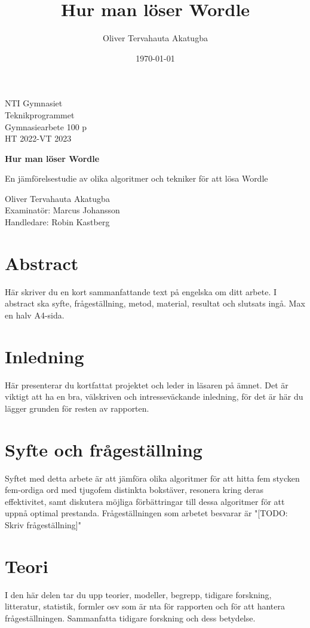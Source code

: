 \documentclass{article}
\title{Hur man löser Wordle}
\author{Oliver Tervahauta Akatugba}
\date{\today}
\begin{document}
\begin{titlepage}
\noindent
NTI Gymnasiet \\
Teknikprogrammet \\
Gymnasiearbete 100 p \\
HT 2022-VT 2023
\begin{center}
\vspace*{1.5cm}
\Huge
\textbf{Hur man löser Wordle}
\vspace{0.5cm}

\large
En jämförelsestudie av olika algoritmer och tekniker för att lösa Wordle
\end{center}

\vfill
\normalsize
\noindent
Oliver Tervahauta Akatugba\\
Examinatör: Marcus Johansson\\
Handledare: Robin Kastberg
\end{titlepage}

\section*{Abstract}
Här skriver du en kort sammanfattande text på engelska om ditt arbete. I abstract ska syfte, frågeställning, metod, material, resultat och slutsats ingå. Max en halv A4-sida. 
\clearpage

\tableofcontents
\clearpage

\section{Inledning}
Här presenterar du kortfattat projektet och leder in läsaren på ämnet. Det är viktigt att ha en bra, välskriven och intresseväckande inledning, för det är här du lägger grunden för resten av rapporten.

\section{Syfte och frågeställning}
Syftet med detta arbete är att jämföra olika algoritmer för att hitta fem stycken fem-ordiga ord med tjugofem distinkta bokstäver, resonera kring deras effektivitet, samt diskutera möjliga förbättringar till dessa algoritmer för att uppnå optimal prestanda. Frågeställningen som arbetet besvarar är "[TODO: Skriv frågeställning]"

\section{Teori}
I den här delen tar du upp teorier, modeller, begrepp, tidigare forskning, litteratur, statistik, formler osv som är nta för rapporten och för att hantera frågeställningen. Sammanfatta tidigare forskning och dess betydelse. 
\end{document}
